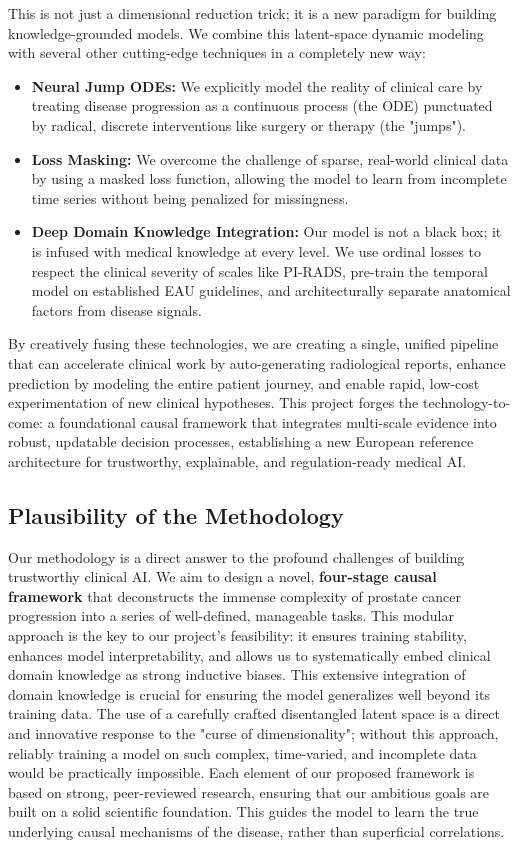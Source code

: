 \documentclass[11pt, a4paper]{article}
\begin{document}
This is not just a dimensional reduction trick; it is a new paradigm for building knowledge-grounded models. We combine this latent-space dynamic modeling with several other cutting-edge techniques in a completely new way:
\begin{itemize}
    \item \textbf{Neural Jump ODEs:} We explicitly model the reality of clinical care by treating disease progression as a continuous process (the ODE) punctuated by radical, discrete interventions like surgery or therapy (the "jumps").
    \item \textbf{Loss Masking:} We overcome the challenge of sparse, real-world clinical data by using a masked loss function, allowing the model to learn from incomplete time series without being penalized for missingness.
    \item \textbf{Deep Domain Knowledge Integration:} Our model is not a black box; it is infused with medical knowledge at every level. We use ordinal losses to respect the clinical severity of scales like PI-RADS, pre-train the temporal model on established EAU guidelines, and architecturally separate anatomical factors from disease signals.
\end{itemize}

By creatively fusing these technologies, we are creating a single, unified pipeline that can accelerate clinical work by auto-generating radiological reports, enhance prediction by modeling the entire patient journey, and enable rapid, low-cost experimentation of new clinical hypotheses. This project forges the technology-to-come: a foundational causal framework that integrates multi-scale evidence into robust, updatable decision processes, establishing a new European reference architecture for trustworthy, explainable, and regulation-ready medical AI.

\subsection{Plausibility of the Methodology}
Our methodology is a direct answer to the profound challenges of building trustworthy clinical AI. We aim to design a novel, \textbf{four-stage causal framework} that deconstructs the immense complexity of prostate cancer progression into a series of well-defined, manageable tasks. This modular approach is the key to our project's feasibility: it ensures training stability, enhances model interpretability, and allows us to systematically embed clinical domain knowledge as strong inductive biases. This extensive integration of domain knowledge is crucial for ensuring the model generalizes well beyond its training data. The use of a carefully crafted disentangled latent space is a direct and innovative response to the "curse of dimensionality"; without this approach, reliably training a model on such complex, time-varied, and incomplete data would be practically impossible. Each element of our proposed framework is based on strong, peer-reviewed research, ensuring that our ambitious goals are built on a solid scientific foundation. This guides the model to learn the true underlying causal mechanisms of the disease, rather than superficial correlations.
\end{document}
